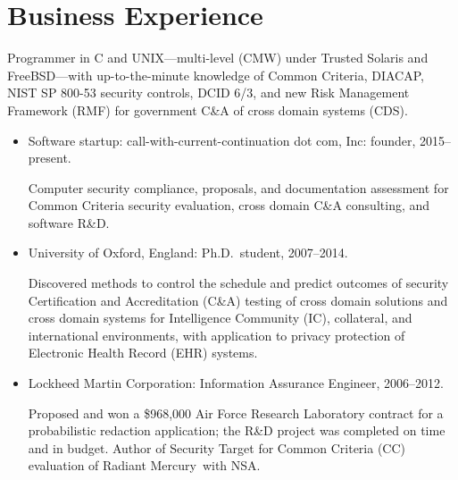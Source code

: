 \section*{Business Experience}

\vspace{-2mm}

Programmer in C and UNIX---multi-level (CMW) under Trusted Solaris and
FreeBSD---with up-to-the-minute knowledge of Common Criteria,
DIACAP, NIST SP 800-53 security controls, DCID 6/3, and new Risk
Management Framework (RMF) for
government C\&A of cross domain systems (CDS).

\begin{itemize}
    \item Software startup: call-with-current-continuation dot com, Inc: founder, 2015--present.
        \vspace{-2mm}
        \begin{myquote}
            Computer security compliance, proposals, and
            documentation assessment for Common Criteria security
            evaluation, cross domain C\&A consulting, and software
            R\&D.
        \end{myquote}

    \vspace{-2mm}
	\item University of Oxford, England: Ph.D.\ student, 2007--2014.
        \vspace{-2mm}
		\begin{myquote}
            Discovered methods to control the schedule and predict
            outcomes of security Certification and Accreditation (C\&A)
            testing of cross domain solutions and cross domain systems for
            Intelligence Community (IC), collateral, and international
            environments, with application to privacy protection
            of Electronic Health Record (EHR) systems.
		\end{myquote}

    \vspace{-2mm}
	\item Lockheed Martin Corporation: Information Assurance Engineer, 2006--2012.
		\vspace{-2mm}
		\begin{myquote}
            Proposed and won a \$968,000 Air Force Research Laboratory
            contract for a probabilistic redaction application; the
            R\&D project was completed on time and in budget. Author of
            Security Target for Common Criteria (CC) evaluation of Radiant
            Mercury\rmtrademark\ with NSA.
		\end{myquote}


\end{itemize}
